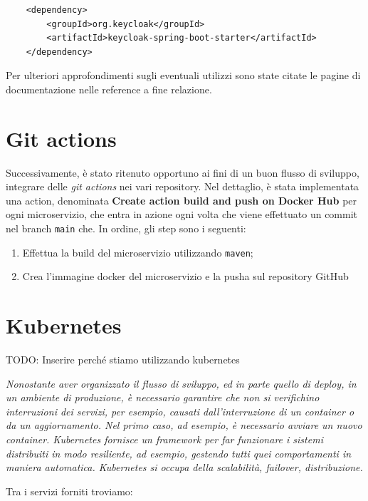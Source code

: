 \documentclass{article}
\begin{document}
\begin{verbatim}
    <dependency>
        <groupId>org.keycloak</groupId>
        <artifactId>keycloak-spring-boot-starter</artifactId>
    </dependency>
\end{verbatim}

Per ulteriori approfondimenti sugli eventuali utilizzi sono state citate le pagine di documentazione nelle reference a fine relazione.

\pagebreak

\section{Git actions}

Successivamente, è stato ritenuto opportuno ai fini di un buon flusso di sviluppo, integrare delle \textit{git actions} nei vari repository.
Nel dettaglio, è stata implementata una action, denominata \textbf{Create action build and push on Docker Hub} per ogni microservizio, che entra in azione ogni volta che viene effettuato un commit nel 
branch \texttt{main} che. In ordine, gli step sono i seguenti:

\begin{enumerate}
    \item Effettua la build del microservizio utilizzando \texttt{maven};
    \item Crea l'immagine docker del microservizio e la pusha sul repository GitHub
\end{enumerate}

\section{Kubernetes}

TODO: Inserire perché stiamo utilizzando kubernetes


\textit{
Nonostante aver organizzato il flusso di sviluppo, ed in parte quello di deploy, in un ambiente di produzione, è necessario garantire che non si verifichino interruzioni
dei servizi, per esempio, causati dall'interruzione di un container o da un aggiornamento. Nel primo caso, ad esempio, è necessario avviare un nuovo
container. Kubernetes fornisce un framework per far funzionare i sistemi distribuiti in modo resiliente, ad esempio, gestendo
tutti quei comportamenti in maniera automatica. Kubernetes si occupa della scalabilità, failover, distribuzione. 
}


Tra i servizi forniti troviamo:
\end{document}
